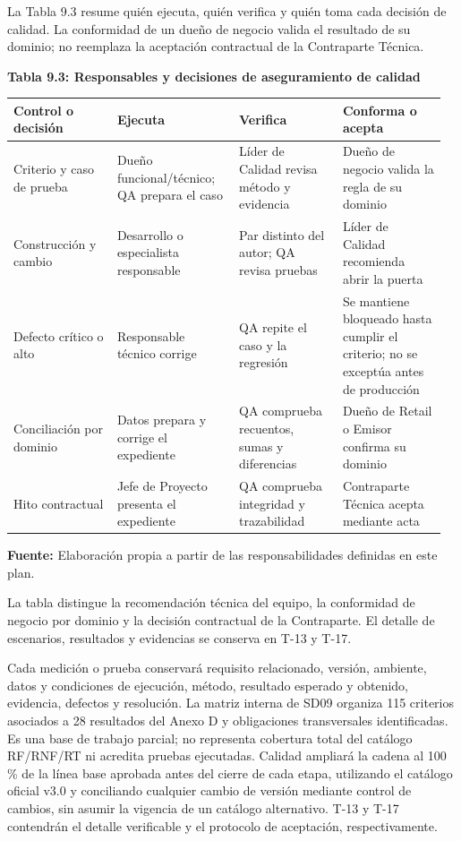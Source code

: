 \documentclass[11pt]{article}
\begin{document}
\clearpage

La Tabla 9.3 resume quién ejecuta, quién verifica y quién toma cada decisión de calidad. La conformidad de un dueño de negocio valida el resultado de su dominio; no reemplaza la aceptación contractual de la Contraparte Técnica.

\textbf{Tabla 9.3: Responsables y decisiones de aseguramiento de calidad}

\begin{longtable}{p{0.23\linewidth}p{0.27\linewidth}p{0.23\linewidth}p{0.23\linewidth}}
\toprule
Control o decisión & Ejecuta & Verifica & Conforma o acepta \\
\midrule
\endhead
Criterio y caso de prueba & Dueño funcional/técnico; QA prepara el caso & Líder de Calidad revisa método y evidencia & Dueño de negocio valida la regla de su dominio \\
Construcción y cambio & Desarrollo o especialista responsable & Par distinto del autor; QA revisa pruebas & Líder de Calidad recomienda abrir la puerta \\
Defecto crítico o alto & Responsable técnico corrige & QA repite el caso y la regresión & Se mantiene bloqueado hasta cumplir el criterio; no se exceptúa antes de producción \\
Conciliación por dominio & Datos prepara y corrige el expediente & QA comprueba recuentos, sumas y diferencias & Dueño de Retail o Emisor confirma su dominio \\
Hito contractual & Jefe de Proyecto presenta el expediente & QA comprueba integridad y trazabilidad & Contraparte Técnica acepta mediante acta \\
\bottomrule
\end{longtable}

\textbf{Fuente:} Elaboración propia a partir de las responsabilidades definidas en este plan.

La tabla distingue la recomendación técnica del equipo, la conformidad de negocio por dominio y la decisión contractual de la Contraparte. El detalle de escenarios, resultados y evidencias se conserva en T-13 y T-17.

Cada medición o prueba conservará requisito relacionado, versión, ambiente, datos y condiciones de ejecución, método, resultado esperado y obtenido, evidencia, defectos y resolución. La matriz interna de SD09 organiza 115 criterios asociados a 28 resultados del Anexo D y obligaciones transversales identificadas. Es una base de trabajo parcial; no representa cobertura total del catálogo RF/RNF/RT ni acredita pruebas ejecutadas. Calidad ampliará la cadena al 100 \% de la línea base aprobada antes del cierre de cada etapa, utilizando el catálogo oficial v3.0 y conciliando cualquier cambio de versión mediante control de cambios, sin asumir la vigencia de un catálogo alternativo. T-13 y T-17 contendrán el detalle verificable y el protocolo de aceptación, respectivamente.
\end{document}
